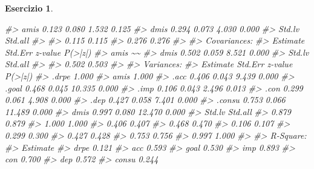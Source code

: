 \documentclass[
  11pt,
]{krantz}
\makeatletter
\newenvironment{Shaded}{\begin{snugshade}}{\end{snugshade}}
\newcommand{\CommentTok}[1]{\textcolor[rgb]{0.37,0.37,0.37}{\textit{#1}}}
\newenvironment{kframe}{%
\medskip{}
\setlength{\fboxsep}{.8em}
 \def\at@end@of@kframe{}%
 \ifinner\ifhmode%
  \def\at@end@of@kframe{\end{minipage}}%
  \begin{minipage}{\columnwidth}%
 \fi\fi%
 \def\FrameCommand##1{\hskip\@totalleftmargin \hskip-\fboxsep
 \colorbox{shadecolor}{##1}\hskip-\fboxsep
     \hskip-\linewidth \hskip-\@totalleftmargin \hskip\columnwidth}%
 \MakeFramed {\advance\hsize-\width
   \@totalleftmargin\z@ \linewidth\hsize
   \@setminipage}}%
 {\par\unskip\endMakeFramed%
 \at@end@of@kframe}
\renewenvironment{Shaded}{\begin{kframe}}{\end{kframe}}
\theoremstyle{definition}
\theoremstyle{definition}
\theoremstyle{definition}
\newtheorem{exercise}{Esercizio}[chapter]
\theoremstyle{definition}
\theoremstyle{remark}
\makeatother
\begin{document}
\begin{exercise}
\begin{Shaded}
\begin{Highlighting}[]
\CommentTok{\#\textgreater{}     amis              0.123    0.080    1.532    0.125}
\CommentTok{\#\textgreater{}     dmis              0.294    0.073    4.030    0.000}
\CommentTok{\#\textgreater{}    Std.lv  Std.all}
\CommentTok{\#\textgreater{}                   }
\CommentTok{\#\textgreater{}     0.115    0.115}
\CommentTok{\#\textgreater{}     0.276    0.276}
\CommentTok{\#\textgreater{} }
\CommentTok{\#\textgreater{} Covariances:}
\CommentTok{\#\textgreater{}                    Estimate  Std.Err  z{-}value  P(\textgreater{}|z|)}
\CommentTok{\#\textgreater{}   amis \textasciitilde{}\textasciitilde{}                                             }
\CommentTok{\#\textgreater{}     dmis              0.502    0.059    8.521    0.000}
\CommentTok{\#\textgreater{}    Std.lv  Std.all}
\CommentTok{\#\textgreater{}                   }
\CommentTok{\#\textgreater{}     0.502    0.503}
\CommentTok{\#\textgreater{} }
\CommentTok{\#\textgreater{} Variances:}
\CommentTok{\#\textgreater{}                    Estimate  Std.Err  z{-}value  P(\textgreater{}|z|)}
\CommentTok{\#\textgreater{}    .drpe              1.000                           }
\CommentTok{\#\textgreater{}     amis              1.000                           }
\CommentTok{\#\textgreater{}    .acc               0.406    0.043    9.439    0.000}
\CommentTok{\#\textgreater{}    .goal              0.468    0.045   10.335    0.000}
\CommentTok{\#\textgreater{}    .imp               0.106    0.043    2.496    0.013}
\CommentTok{\#\textgreater{}    .con               0.299    0.061    4.908    0.000}
\CommentTok{\#\textgreater{}    .dep               0.427    0.058    7.401    0.000}
\CommentTok{\#\textgreater{}    .consu             0.753    0.066   11.489    0.000}
\CommentTok{\#\textgreater{}     dmis              0.997    0.080   12.470    0.000}
\CommentTok{\#\textgreater{}    Std.lv  Std.all}
\CommentTok{\#\textgreater{}     0.879    0.879}
\CommentTok{\#\textgreater{}     1.000    1.000}
\CommentTok{\#\textgreater{}     0.406    0.407}
\CommentTok{\#\textgreater{}     0.468    0.470}
\CommentTok{\#\textgreater{}     0.106    0.107}
\CommentTok{\#\textgreater{}     0.299    0.300}
\CommentTok{\#\textgreater{}     0.427    0.428}
\CommentTok{\#\textgreater{}     0.753    0.756}
\CommentTok{\#\textgreater{}     0.997    1.000}
\CommentTok{\#\textgreater{} }
\CommentTok{\#\textgreater{} R{-}Square:}
\CommentTok{\#\textgreater{}                    Estimate}
\CommentTok{\#\textgreater{}     drpe              0.121}
\CommentTok{\#\textgreater{}     acc               0.593}
\CommentTok{\#\textgreater{}     goal              0.530}
\CommentTok{\#\textgreater{}     imp               0.893}
\CommentTok{\#\textgreater{}     con               0.700}
\CommentTok{\#\textgreater{}     dep               0.572}
\CommentTok{\#\textgreater{}     consu             0.244}
\end{Highlighting}
\end{Shaded}


\end{exercise}
\end{document}
